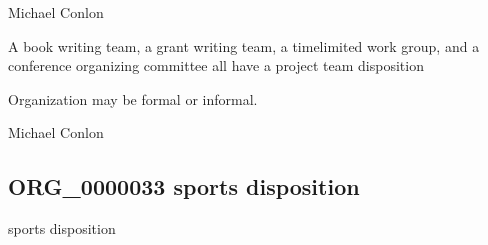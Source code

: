 \documentclass[letterpaper,10pt,english]{sphinxmanual}
\begin{document}
\begin{sphinxShadowBox}

\sphinxAtStartPar
Michael Conlon 
\end{sphinxShadowBox}

\begin{sphinxShadowBox}

\sphinxAtStartPar
A book writing team, a grant writing team, a time\sphinxhyphen{}limited work group, and a conference organizing committee all have a project team disposition
\end{sphinxShadowBox}

\begin{sphinxShadowBox}

\sphinxAtStartPar
Organization may be formal or informal.
\end{sphinxShadowBox}

\begin{sphinxShadowBox}

\sphinxAtStartPar
{}
\end{sphinxShadowBox}

\begin{sphinxShadowBox}

\sphinxAtStartPar
Michael Conlon 
\end{sphinxShadowBox}
\begin{quote}

\ignorespaces \end{quote}


\subsection{ORG\_0000033 \sphinxhyphen{} sports disposition}
\label{\detokenize{doc-ORG_0000033:org-0000033-sports-disposition}}\label{\detokenize{doc-ORG_0000033:index-0}}\label{\detokenize{doc-ORG_0000033::doc}}
\begin{sphinxShadowBox}

\sphinxAtStartPar
sports disposition
\end{sphinxShadowBox}
\end{document}

